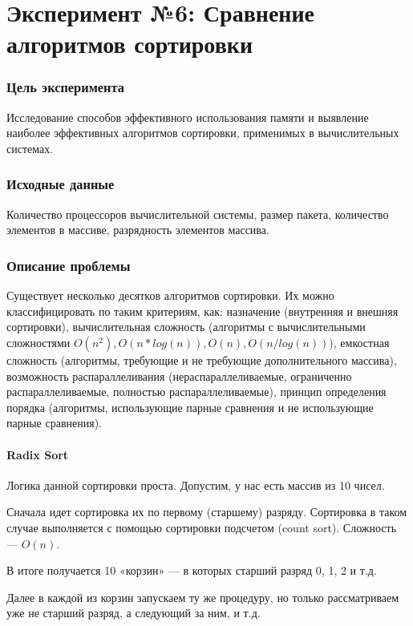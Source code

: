 \chapter*{\textbf{Эксперимент №6: Сравнение алгоритмов сортировки}}

\subsection*{\textbf{Цель эксперимента}}
Исследование способов эффективного использования памяти и выявление наиболее эффективных алгоритмов сортировки, применимых в вычислительных системах. 

\subsection*{\textbf{Исходные данные}}
Количество процессоров вычислительной системы, размер пакета, количество элементов в массиве, разрядность элементов массива.

\subsection*{\textbf{Описание проблемы}}
Существует несколько десятков алгоритмов сортировки. Их можно классифицировать по таким критериям, как: назначение (внутренняя и внешняя сортировки), вычислительная сложность (алгоритмы с вычислительными сложностями $O(n^2), O(n*log(n)), O(n), O(n/log(n))$), емкостная сложность (алгоритмы, требующие и не требующие дополнительного массива), возможность распараллеливания (нераспараллеливаемые, ограниченно распараллеливаемые, полностью распараллеливаемые), принцип определения порядка (алгоритмы, использующие парные сравнения и не использующие парные сравнения).  

\subsubsection{\textbf{Radix Sort}}

Логика данной сортировки проста. Допустим, у нас есть массив из 10 чисел.

Сначала идет сортировка их по первому (старшему) разряду. Сортировка в таком случае выполняется с помощью сортировки подсчетом (count sort). Сложность — $O(n)$. 

В итоге получается 10 «корзин» — в которых старший разряд 0, 1, 2 и т.д.

Далее в каждой из корзин запускаем ту же процедуру, но только рассматриваем уже не старший разряд, а следующий за ним, и т.д.


